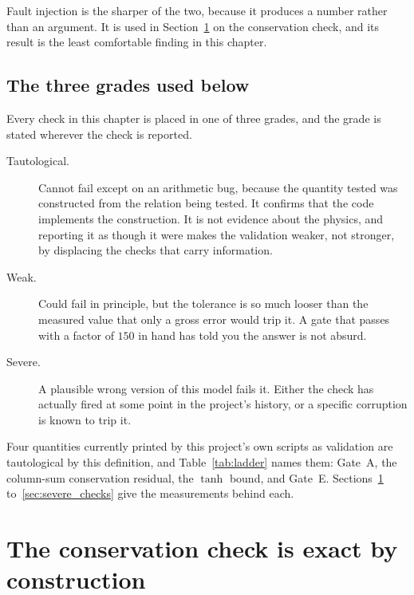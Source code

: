 Fault injection is the sharper of the two, because it produces a number rather
than an argument. It is used in Section~\ref{sec:conservation_severity} on the
conservation check, and its result is the least comfortable finding in this
chapter.

\subsection{The three grades used below}

Every check in this chapter is placed in one of three grades, and the grade is
stated wherever the check is reported.

\begin{description}
\item[Tautological.] Cannot fail except on an arithmetic bug, because the
quantity tested was constructed from the relation being tested. It confirms
that the code implements the construction. It is not evidence about the
physics, and reporting it as though it were makes the validation weaker, not
stronger, by displacing the checks that carry information.

\item[Weak.] Could fail in principle, but the tolerance is so much looser than
the measured value that only a gross error would trip it. A gate that passes
with a factor of $150$ in hand has told you the answer is not absurd.

\item[Severe.] A plausible wrong version of this model fails it. Either the
check has actually fired at some point in the project's history, or a specific
corruption is known to trip it.
\end{description}

Four quantities currently printed by this project's own scripts as validation
are tautological by this definition, and Table~\ref{tab:ladder} names them:
Gate~A, the column-sum conservation residual, the $\tanh$ bound, and Gate~E.
Sections~\ref{sec:conservation_severity} to~\ref{sec:severe_checks} give the
measurements behind each.

\section{The conservation check is exact by construction}
\label{sec:conservation_severity}

